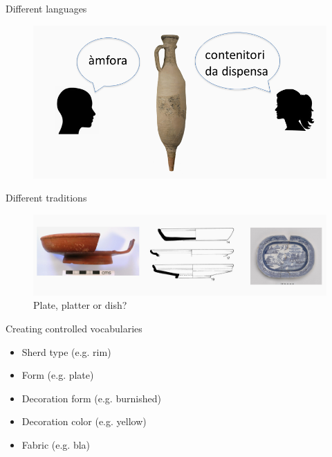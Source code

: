 \documentclass[xcolor=x11names, aspectratio=169,usenames,dvipsnames]{beamer}
\begin{document}
\begin{frame}{Different languages}
\begin{center}
\begin{figure}
\includegraphics[width=\textwidth]{img/tim_vocab_1.png}
\end{figure}
\end{center}
\end{frame}

\begin{frame}{Different traditions}
\begin{center}
\begin{figure}
\includegraphics[width=\textwidth]{img/tim_plate_platter_dish.jpg}
\caption{Plate, platter or dish?}
\end{figure}
\end{center}
\end{frame}

\begin{frame}{Creating controlled vocabularies}
\begin{itemize}
\item Sherd type (e.g. rim)
\item Form (e.g. plate)
\item Decoration form (e.g. burnished)
\item Decoration color (e.g. yellow)
\item Fabric (e.g. bla)
\end{itemize}
\end{frame}
\end{document}
